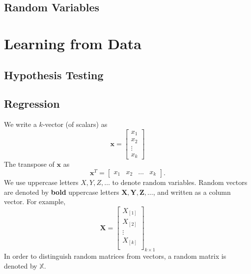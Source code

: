 \documentclass[
]{book}
\theoremstyle{definition}
\theoremstyle{definition}
\theoremstyle{definition}
\theoremstyle{definition}
\theoremstyle{remark}
\begin{document}
\hypertarget{random-variables}{%
\chapter{Random Variables}\label{random-variables}}

\hypertarget{part-learning-from-data}{%
\part{Learning from Data}\label{part-learning-from-data}}

\hypertarget{hypothesis-testing}{%
\chapter{Hypothesis Testing}\label{hypothesis-testing}}

\hypertarget{regression}{%
\chapter{Regression}\label{regression}}

We write a \(k\)-vector (of scalars) as
\[
{\boldsymbol{x}}=
\begin{bmatrix}
x_1 \\
x_2 \\
\vdots \\
x_k
\end{bmatrix}
\]
The transpose of \({\boldsymbol{x}}\) as
\[
{\boldsymbol{x}}^T=
\begin{bmatrix}
x_1 & x_2 & \ldots & x_k
\end{bmatrix}.
\]
We use uppercase letters \(X,Y,Z,\ldots\) to denote random variables. Random vectors are denoted by \textbf{bold} uppercase letters \({\boldsymbol{X}},{\boldsymbol{Y}},{\boldsymbol{Z}},\ldots\), and written as a column vector. For example, \[
{\boldsymbol{X}}=
\begin{bmatrix}
X_{[1]}\\
X_{[2]}\\
\vdots \\
X_{[k]} \\
\end{bmatrix}_{k\times 1}
\]
In order to distinguish random matrices from vectors, a random matrix is denoted by \({\mathbb{X}}\).
\end{document}
